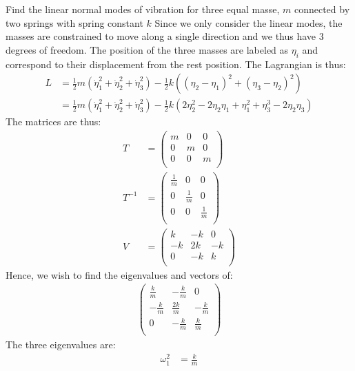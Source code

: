 \begin{example}{0pt}{Find the linear normal modes of vibration for three equal masse, $m$ connected by two springs with spring constant $k$}{}
Since we only consider the linear modes, the masses are constrained to move along a single direction and we thus have 3 degrees of freedom. The position of the three masses are labeled as $\eta_i$ and correspond to their displacement from  the rest position. The Lagrangian is thus:
\begin{align*}
L&=\frac{1}{2}m(\dot\eta_1^2+\dot\eta_2^2+\dot\eta_3^2)-\frac{1}{2}k\left((\eta_2-\eta_1)^2+(\eta_3-\eta_2)^2  \right)\nonumber\\
&=\frac{1}{2}m(\dot\eta_1^2+\dot\eta_2^2+\dot\eta_3^2)-\frac{1}{2}k(2\eta_2^2-2\eta_2\eta_1+\eta_1^2+\eta_3^3-2\eta_2\eta_3)
\end{align*}
The matrices are thus: 
\begin{align}
T&= \left( \begin{array}{ccc}
m &0 &0\\
0 &m &0\\
0 &0 &m\\
\end{array}      \right) \nonumber\\
T^{-1}&= \left( \begin{array}{ccc}
\frac{1}{m} &0 &0\\
0 &\frac{1}{m} &0\\
0 &0 &\frac{1}{m}\\
\end{array}      \right) \nonumber\\
V&= \left( \begin{array}{ccc}
k &-k &0\\
-k &2k &-k\\
0 &-k &k\\
\end{array}      \right)
\end{align}
Hence, we wish to find the eigenvalues and vectors of:
\begin{align*}
\left( \begin{array}{ccc}
\frac{k}{m} &-\frac{k}{m} &0\\
-\frac{k}{m} &\frac{2k}{m} &-\frac{k}{m}\\
0 &-\frac{k}{m} &\frac{k}{m}\\
\end{array}      \right)
\end{align*}
The three eigenvalues are:
\begin{align*}
\omega_1^2&=\frac{k}{m}\\

\end{align*}
\end{example}
